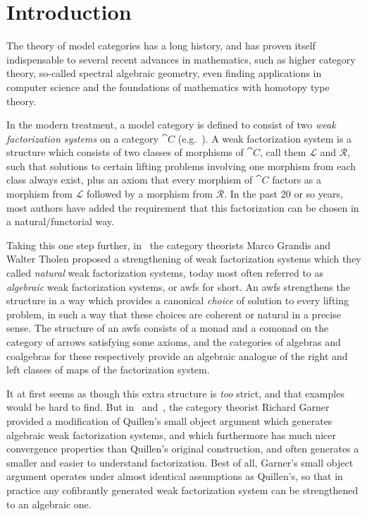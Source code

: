 
\chapter{Introduction}

The theory of model categories has a long history, and has proven itself indispensable to several recent advances in mathematics, such as higher category theory, so-called spectral algebraic geometry, even finding applications in computer science and the foundations of mathematics with homotopy type theory.

In the modern treatment, a model category is defined to consist of two \emph{weak factorization systems} on a category $\cat{C}$ (e.g.~\cite{mp:more-concise}). A weak factorization system is a structure which consists of two classes of morphisms of $\cat{C}$, call them $\mathcal{L}$ and $\mathcal{R}$, such that solutions to certain lifting problems involving one morphism from each class always exist, plus an axiom that every morphism of $\cat{C}$ factors as a morphism from $\mathcal{L}$ followed by a morphism from $\mathcal{R}$. In the past 20 or so years, most authors have added the requirement that this factorization can be chosen in a natural/functorial way.

Taking this one step further, in~\cite{gt:nwfs} the category theorists Marco Grandis and Walter Tholen proposed a strengthening of weak factorization systems which they called \emph{natural} weak factorization systems, today most often referred to as \emph{algebraic} weak factorization systems, or awfs for short. An awfs strengthens the structure in a way which provides a canonical \emph{choice} of solution to every lifting problem, in such a way that these choices are coherent or natural in a precise sense. The structure of an awfs consists of a monad and a comonad on the category of arrows satisfying some axioms, and the categories of algebras and coalgebras for these respectively provide an algebraic analogue of the right and left classes of maps of the factorization system.

It at first seems as though this extra structure is \emph{too} strict, and that examples would be hard to find. But in~\cite{garner:nwfs} and~\cite{garner:soa}, the category theorist Richard Garner provided a modification of Quillen's small object argument which generates algebraic weak factorization systems, and which furthermore has much nicer convergence properties than Quillen's original construction, and often generates a smaller and easier to understand factorization. Best of all, Garner's small object argument operates under almost identical assumptions as Quillen's, so that in practice any cofibrantly generated weak factorization system can be strengthened to an algebraic one.

